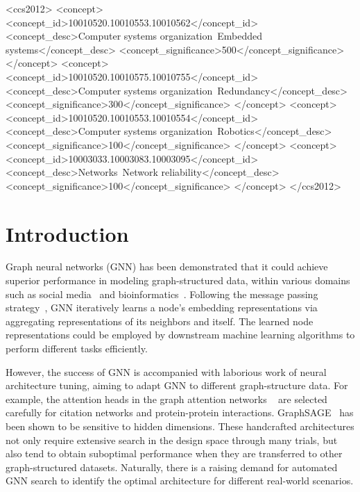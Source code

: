 \documentclass[sigconf]{acmart}
\begin{document}
\begin{CCSXML}
<ccs2012>
 <concept>
  <concept_id>10010520.10010553.10010562</concept_id>
  <concept_desc>Computer systems organization~Embedded systems</concept_desc>
  <concept_significance>500</concept_significance>
 </concept>
 <concept>
  <concept_id>10010520.10010575.10010755</concept_id>
  <concept_desc>Computer systems organization~Redundancy</concept_desc>
  <concept_significance>300</concept_significance>
 </concept>
 <concept>
  <concept_id>10010520.10010553.10010554</concept_id>
  <concept_desc>Computer systems organization~Robotics</concept_desc>
  <concept_significance>100</concept_significance>
 </concept>
 <concept>
  <concept_id>10003033.10003083.10003095</concept_id>
  <concept_desc>Networks~Network reliability</concept_desc>
  <concept_significance>100</concept_significance>
 </concept>
</ccs2012>
\end{CCSXML}








\maketitle
{}
\section{Introduction}
Graph neural networks (GNN) \cite{gori2005new, scarselli2009graph} has been demonstrated that it could achieve superior performance in modeling graph-structured data, within various domains such as social media~\cite{grover2016node2vec, perozzi2014deepwalk, tang2015line, wang2016structural} and bioinformatics~\cite{zitnik2017predicting, RNN2018}.
Following the message passing strategy~\cite{hamilton2017inductive}, GNN iteratively learns a node's embedding representations via aggregating representations of its neighbors and itself. The learned node representations could be employed by downstream machine learning algorithms to perform different tasks efficiently.
 


However, the success of GNN is accompanied with laborious work of neural architecture tuning, aiming to adapt GNN to different graph-structure data. For example, the attention heads in the graph attention networks ~\cite{velickovic2017graph} are selected carefully for citation networks and protein-protein interactions.
GraphSAGE~\cite{hamilton2017inductive} has been shown to be sensitive to hidden dimensions. 
These handcrafted architectures not only require extensive search in the design space through many trials, but also tend to obtain suboptimal performance when they are transferred to other graph-structured datasets. 
Naturally, there is a raising demand for automated GNN search to identify the optimal architecture for different real-world scenarios.
\end{document}
